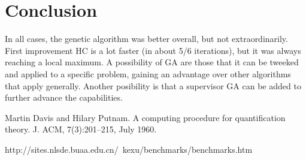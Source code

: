 \documentclass{article}
\begin{document}
\section{Conclusion}

In all cases, the genetic algorithm was better overall, but not extraordinarily.
First improvement HC is a lot faster (in about 5/6 iterations), but it was always reaching a local maximum.
A possibility of GA are those that it can be tweeked and applied to a specific problem, gaining an advantage over other algorithms that apply generally. Another posibility is that a supervisor GA can be added to further advance the capabilities. 







%
%

\begin{thebibliography}{1}

 Martin Davis and Hilary Putnam. A computing procedure for quantification theory. J. ACM, 7(3):201–215, July 1960.

http://sites.nlsde.buaa.edu.cn/~kexu/benchmarks/benchmarks.htm

\end{thebibliography}  
\end{document}
